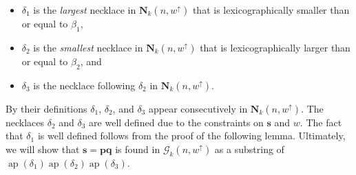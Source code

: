 \documentclass[US-letter,USenglish,authorcolumns,autoref]{lipics-v2021}
\newcommand{\bN}{\mathbf{N}}
\newcommand{\bp}{\mathbf{p}}
\newcommand{\bs}{\mathbf{s}}
\newcommand{\bq}{\mathbf{q}}
\DeclareMathOperator{\ap}{ap}
\begin{document}
%
\begin{itemize}
 \item $\delta_1$ is the \emph{largest} necklace in $\bN_k(n,w^\uparrow)$ that is lexicographically smaller than or equal to $\beta_1$,  
 \item $\delta_2$ is the \emph{smallest} necklace in $\bN_k(n,w^\uparrow)$ that is lexicographically larger than or equal to $\beta_2$, and
 \item $\delta_3$ is the necklace following $\delta_2$ in $\bN_k(n,w^\uparrow)$.
\end{itemize}
%
By their definitions $\delta_1$, $\delta_2$, and $\delta_3$ appear consecutively in $\bN_k(n,w^\uparrow)$.  The necklaces $\delta_2$ and $\delta_3$ are well defined due to the constraints on $\bs$ and $w$.  The fact that $\delta_1$ is well defined follows from the proof of the following lemma. Ultimately, we will show that $\bs = \bp\bq$ is found in $\mathcal{G}_k(n,w^\uparrow)$ as a substring of $\ap(\delta_1)\ap(\delta_2)\ap(\delta_3)$.
\end{document}
